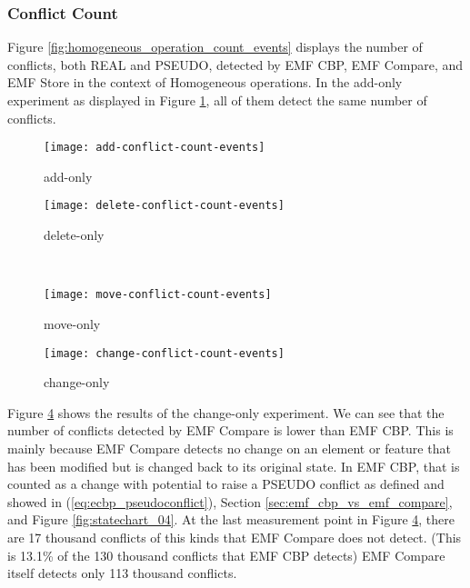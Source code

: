 \subsubsection{Conflict Count}
\label{sec:conflict_count}
Figure \ref{fig:homogeneous_operation_count_events} displays the number of conflicts, both \textsf{REAL} and \textsf{PSEUDO}, detected by EMF CBP, EMF Compare, and EMF Store in the context of Homogeneous operations. In the add-only experiment as displayed in Figure \ref{fig:add-conflict-count-events}, all of them detect the same number of conflicts.

\begin{figure*}[ht]
  \centering
  \begin{subfigure}[t]{0.490\linewidth}
    \texttt{[image: add-conflict-count-events]}
    \caption{add-only}
    \label{fig:add-conflict-count-events}
  \end{subfigure}
  \hfill
  \begin{subfigure}[t]{0.490\linewidth}
    \texttt{[image: delete-conflict-count-events]}
    \caption{delete-only}
    \label{fig:delete-conflict-count-events}
  \end{subfigure}
  \\
  \begin{subfigure}[t]{0.490\linewidth}
    \texttt{[image: move-conflict-count-events]}
    \caption{move-only}
    \label{fig:move-conflict-count-events}
  \end{subfigure}
  \hfill
  \begin{subfigure}[t]{0.490\linewidth}
    \texttt{[image: change-conflict-count-events]}
    \caption{change-only}
    \label{fig:change-conflict-count-events}
  \end{subfigure}
  \caption{Conflict detection count for homogeneous operations.}
  \label{fig:homogeneous_operation_count_events}
\end{figure*}

Figure \ref{fig:change-conflict-count-events} shows the results of the change-only experiment. We can see that the number of conflicts detected by EMF Compare is lower than EMF CBP. This is mainly because EMF Compare detects no change on an element or feature that has been modified but is changed back to its original state. In EMF CBP, that is counted as a change with potential to raise a {PSEUDO} conflict as defined and showed in (\ref{eq:ecbp_pseudoconflict}), Section \ref{sec:emf_cbp_vs_emf_compare}, and Figure \ref{fig:statechart_04}. At the last measurement point in Figure \ref{fig:change-conflict-count-events}, there are 17 thousand conflicts of this kinds that EMF Compare does not detect. (This is 13.1\% of the 130 thousand conflicts that EMF CBP detects) EMF Compare itself detects only 113 thousand conflicts.

